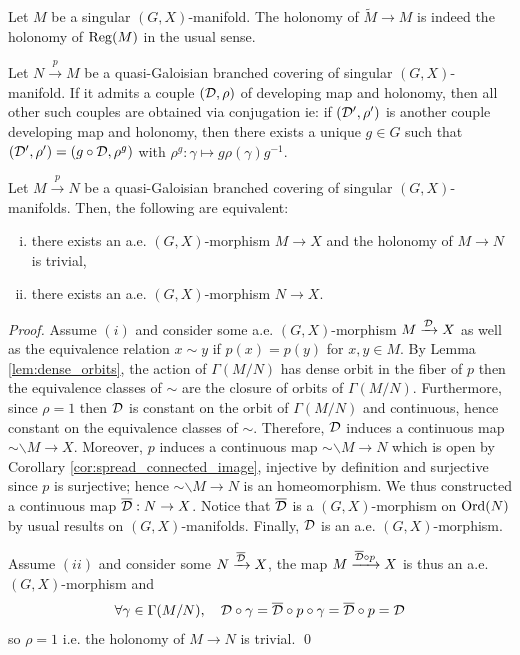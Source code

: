 \begin{rem} 
 Let $M$ be a singular $(G,X)$-manifold. The holonomy of $\widetilde M \rightarrow M$ is indeed the holonomy of $\mathrm{Reg}(M)$ in the usual sense.
\end{rem}
\begin{lem}
 Let $N\xrightarrow{p} M$ be a quasi-Galoisian branched covering of singular $(G,X)$-manifold. If it admits a couple $(\mathcal{D},\rho)$ of developing map and holonomy, then all other such couples are obtained via conjugation ie:
 if $(\mathcal{D}',\rho')$ is another couple developing map and holonomy, then there exists a unique $g\in G$ such that $(\mathcal{D}',\rho')= (g\circ\mathcal{D},\rho^g)$ with $\rho^g  : \gamma \mapsto g\rho(\gamma)g^{-1}$.
\end{lem}



  
\begin{lem}\label{lem:descend_developing_map} Let $M\xrightarrow{p} N$ be a quasi-Galoisian branched covering of singular $(G,X)$-manifolds. Then, the following are equivalent:
\begin{enumerate}[(i)]
 \item there exists an a.e. $(G,X)$-morphism $M\rightarrow X$ and the holonomy of $M\rightarrow N$ is trivial,
 \item there exists an a.e. $(G,X)$-morphism $N\rightarrow X$. 
\end{enumerate} 
\end{lem}
\begin{proof}
 Assume $(i)$ and consider some a.e. $(G,X)$-morphism $M\xrightarrow{\mathcal{D}} X$ as well as the equivalence relation $x\sim y$ if $p(x)=p(y)$ for $x,y\in M$.
 By Lemma \ref{lem:dense_orbits}, the action of $\Gamma(M/N)$ has dense 
 orbit in the fiber of $p$ then the equivalence classes of $\sim$ are 
 the closure of orbits of $\Gamma(M/N)$. Furthermore, since $\rho=1$ 
 then $\mathcal{D}$ is constant on the orbit of $\Gamma(M/N)$ and continuous, hence constant on the equivalence classes of $\sim$. Therefore, $\mathcal{D}$ induces a continuous map $\sim\backslash M \rightarrow X$. Moreover, $p$ induces a continuous map $\sim\backslash M \rightarrow N$ which is open by Corollary \ref{cor:spread_connected_image}, injective by definition and surjective since $p$ is surjective; hence $\sim\backslash M \rightarrow N$ is an homeomorphism. We thus constructed a continuous map $\overline {\mathcal{D}}:N \rightarrow X$. Notice that $\overline {\mathcal{D}}$ is a $(G,X)$-morphism on $\mathrm{Ord}(N)$ by usual results on $(G,X)$-manifolds. Finally, $\mathcal{D}$ is an a.e. $(G,X)$-morphism. 
 
 Assume $(ii)$ and consider some $N\xrightarrow{\overline {\mathcal{D}}} X$, the map $ M \xrightarrow{\overline {\mathcal{D}} \circ p} X$ is thus an a.e. $(G,X)$-morphism and 
 $$\forall \gamma\in \Gamma(M/N),\quad \mathcal{D}\circ\gamma =  \overline {\mathcal{D}}\circ p\circ \gamma = \overline {\mathcal{D}}\circ p = \mathcal{D} $$
 so $\rho= 1$ i.e. the holonomy of $M\rightarrow N$ is trivial. 
\qed\end{proof}


